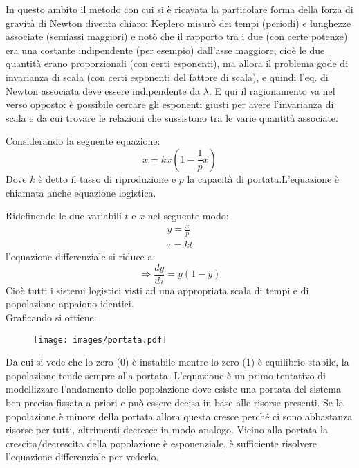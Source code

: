 \documentclass[Main.tex]{subfiles}
\begin{document}
\begin{appendic}
\bigskip
In questo ambito il metodo con cui si è ricavata la particolare forma della forza di gravità di Newton diventa chiaro: Keplero misurò dei tempi (periodi) e lunghezze associate (semiassi maggiori) e notò che il rapporto tra i due (con certe potenze) era una costante indipendente (per esempio) dall'asse maggiore, cioè le due quantità erano proporzionali (con certi esponenti), ma allora il problema gode di invarianza di scala (con certi esponenti del fattore di scala), e quindi l'eq. di Newton associata deve essere indipendente da $\lambda$. E qui il ragionamento va nel verso opposto: è possibile cercare gli esponenti giusti per avere l'invarianza di scala e da cui trovare le relazioni che sussistono tra le varie quantità associate.
\end{appendic}

\newpage

\begin{appendic} 
 Considerando la seguente equazione:
\begin{equation}
  \dot x = k x (1- \frac{1}{p} x)
\end{equation} 
Dove $k$ è detto il tasso di riproduzione e $p$ la capacità di portata.L'equazione è chiamata anche equazione logistica.

Ridefinendo le due variabili $t$ e $x$ nel seguente modo:
\begin{gather}
	y= \frac{x}{p}\\
	\tau =kt
\end{gather}
l'equazione differenziale si riduce a:
\begin{equation}
  \Longrightarrow \frac{dy}{d \tau} = y(1-y)
\end{equation}
Cioè tutti i sistemi logistici visti ad una appropriata scala di tempi e di popolazione appaiono identici.\\
Graficando si ottiene:

\begin{figure}[H]
    \centering
  \texttt{[image: images/portata.pdf]}
\end{figure}

Da cui si vede che lo zero (0) è instabile mentre lo zero (1) è equilibrio stabile, la popolazione tende sempre alla portata. L'equazione è un primo tentativo di modellizzare l'andamento delle popolazione dove esiste una portata del sistema ben precisa fissata a priori e può essere decisa in base alle risorse presenti. Se la popolazione è minore della portata allora questa cresce perché ci sono abbastanza risorse per tutti, altrimenti decresce in modo analogo. Vicino alla portata la crescita/decrescita della popolazione è esponenziale, è sufficiente risolvere l'equazione differenziale per vederlo.
\end{appendic}
\end{document}
